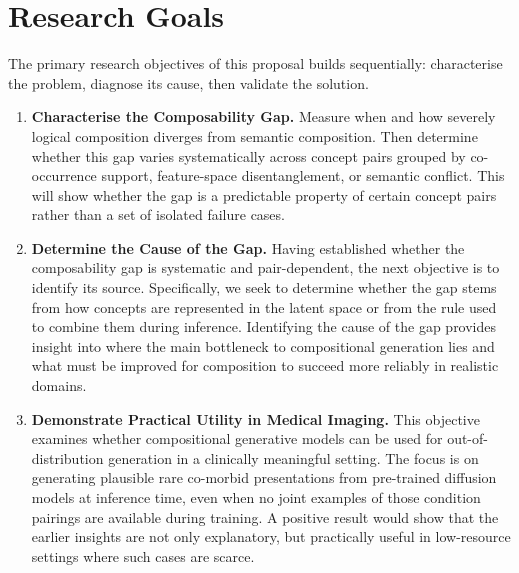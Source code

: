 
\section{Research Goals}
\label{sec:research_objectives_research_goal}

The primary research objectives of this proposal builds sequentially: characterise the problem, diagnose its cause, then validate the solution.

\begin{enumerate}

    \item \textbf{Characterise the Composability Gap.}
    Measure when and how severely logical composition diverges from semantic composition. 
    Then determine whether this gap varies systematically across concept pairs grouped by co-occurrence support, feature-space disentanglement, or semantic conflict. 
    This will show whether the gap is a predictable property of certain concept pairs rather than a set of isolated failure cases.

    \item \textbf{Determine the Cause of the Gap.}
    Having established whether the composability gap is systematic and pair-dependent, the next objective is to identify its source.
    Specifically, we seek to determine whether the gap stems from how concepts are represented in the latent space or from the rule used to combine them during inference.
    Identifying the cause of the gap provides insight into where the main bottleneck to compositional generation lies and what must be improved for composition to succeed more reliably in realistic domains.


    \item \textbf{Demonstrate Practical Utility in Medical Imaging.}
    This objective examines whether compositional generative models can be used for out-of-distribution generation in a clinically meaningful setting.
    The focus is on generating plausible rare co-morbid presentations from pre-trained diffusion models at inference time, even when no joint examples of those condition pairings are available during training.
    A positive result would show that the earlier insights are not only explanatory, but practically useful in low-resource settings where such cases are scarce.



\end{enumerate}
